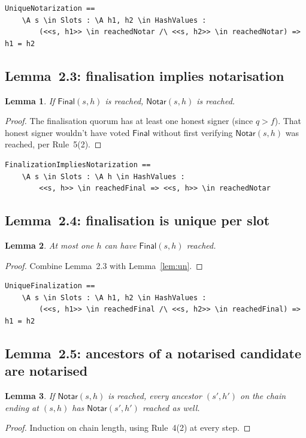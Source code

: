 \documentclass[11pt,a4paper]{article}
\newcommand{\Notar}{\mathsf{Notar}}
\newcommand{\Final}{\mathsf{Final}}
\newtheorem{lemma}{Lemma}
\begin{document}
\begin{lstlisting}
UniqueNotarization ==
    \A s \in Slots : \A h1, h2 \in HashValues :
        (<<s, h1>> \in reachedNotar /\ <<s, h2>> \in reachedNotar) => h1 = h2
\end{lstlisting}

\subsection{Lemma~2.3: finalisation implies notarisation}

\begin{lemma}
If $\Final(s,h)$ is reached, $\Notar(s,h)$ is reached.
\end{lemma}
\begin{proof}
The finalisation quorum has at least one honest signer (since $q > f$).
That honest signer wouldn't have voted $\Final$ without first
verifying $\Notar(s,h)$ was reached, per Rule~5(2).
\end{proof}

\begin{lstlisting}
FinalizationImpliesNotarization ==
    \A s \in Slots : \A h \in HashValues :
        <<s, h>> \in reachedFinal => <<s, h>> \in reachedNotar
\end{lstlisting}

\subsection{Lemma~2.4: finalisation is unique per slot}

\begin{lemma}
At most one $h$ can have $\Final(s,h)$ reached.
\end{lemma}
\begin{proof}
Combine Lemma~2.3 with Lemma~\ref{lem:un}.
\end{proof}

\begin{lstlisting}
UniqueFinalization ==
    \A s \in Slots : \A h1, h2 \in HashValues :
        (<<s, h1>> \in reachedFinal /\ <<s, h2>> \in reachedFinal) => h1 = h2
\end{lstlisting}

\subsection{Lemma~2.5: ancestors of a notarised candidate are notarised}

\begin{lemma}\label{lem:chain}
If $\Notar(s,h)$ is reached, every ancestor $(s',h')$ on the chain
ending at $(s,h)$ has $\Notar(s',h')$ reached as well.
\end{lemma}
\begin{proof}
Induction on chain length, using Rule~4(2) at every step.
\end{proof}
\end{document}
